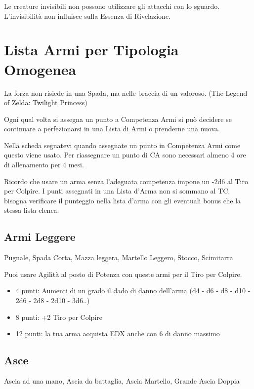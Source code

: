 \documentclass[a4paper,11pt,twoside,openany]{book}
\begin{document}
Le creature invisibili non possono utilizzare gli attacchi con lo sguardo. L'invisibilità non influisce sulla Essenza di Rivelazione.

\pagebreak

\section{Lista Armi per Tipologia Omogenea}

\label{lista-armi-per-tipologia-omogenea}
\begin{tcolorbox}[enhanced,arc=5pt,boxrule=0.3pt]{La forza non risiede in una Spada, ma nelle braccia di un valoroso. (The Legend of Zelda: Twilight Princess)}\end{tcolorbox}\medskip

Ogni qual volta si assegna un punto a Competenza Armi si può decidere se continuare a perfezionarsi in una Lista di Armi o prenderne una nuova.

Nella scheda segnatevi quando assegnate un punto in Competenza Armi come questo viene usato.
Per riassegnare un punto di CA sono necessari almeno 4 ore di allenamento per 4 mesi.

Ricordo che usare un arma senza l'adeguata competenza impone un -2d6 al Tiro per Colpire.
I punti assegnati in una Lista d'Arma non si sommano al TC, bisogna verificare il punteggio nella lista d'arma con gli eventuali bonus che la stessa lista elenca.

\subsection{Armi Leggere}Pugnale, Spada Corta, Mazza leggera, Martello Leggero, Stocco, Scimitarra

Puoi usare Agilità al posto di Potenza con queste armi per il Tiro per Colpire.

\begin{itemize}
	\item 4 punti: Aumenti di un grado il dado di danno dell'arma (d4 - d6 - d8 - d10 - 2d6 - 2d8 - 2d10 - 3d6..)

	\item 8 punti: +2 Tiro per Colpire

	\item 12 punti: la tua arma acquista EDX anche con 6 di danno massimo
\end{itemize}

\subsection{Asce} Ascia ad una mano, Ascia da battaglia, Ascia Martello, Grande Ascia Doppia
\end{document}
